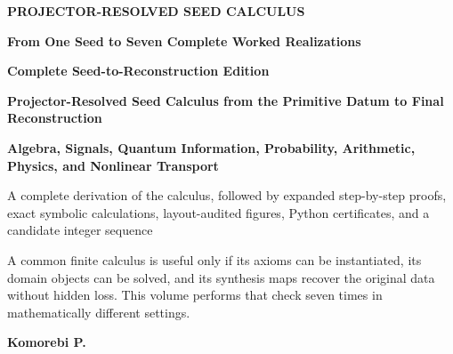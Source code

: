 \documentclass[11pt,oneside]{book}
\theoremstyle{definition}
\theoremstyle{remark}
\begin{document}
\begin{titlepage}
\thispagestyle{empty}
\centering
{}
\vspace*{0.72in}
{\Large\color{Blue}\bfseries PROJECTOR-RESOLVED SEED CALCULUS\par}
\vspace{0.18in}
{\Huge\bfseries From One Seed to Seven Complete Worked Realizations\par}
\vspace{0.10in}
{\LARGE\bfseries Complete Seed-to-Reconstruction Edition\par}
\vspace{0.12in}
{\LARGE\bfseries Projector-Resolved Seed Calculus from the Primitive Datum to Final Reconstruction\par}
\vspace{0.08in}
{\Large\bfseries Algebra, Signals, Quantum Information, Probability, Arithmetic, Physics, and Nonlinear Transport\par}
\vspace{0.35in}
{\Large\color{Muted} A complete derivation of the calculus, followed by expanded step-by-step proofs, exact symbolic calculations, layout-audited figures, Python certificates, and a candidate integer sequence\par}
\vfill
\begin{minipage}{0.80\linewidth}
\large
A common finite calculus is useful only if its axioms can be instantiated, its domain objects can be solved, and its synthesis maps recover the original data without hidden loss. This volume performs that check seven times in mathematically different settings.
\end{minipage}
\vfill
{\Large\bfseries Komorebi P.\par}
\vspace{0.50in}
\end{titlepage}

\frontmatter
\end{document}
